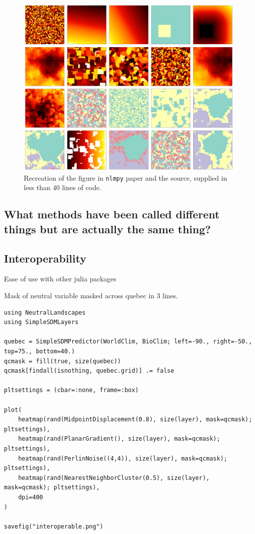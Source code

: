 \documentclass[11pt]{article}
\makeatletter
\def\maxwidth{\ifdim\Gin@nat@width>\linewidth\linewidth
\else\Gin@nat@width\fi}
\let\Oldincludegraphics\includegraphics
\renewcommand{\includegraphics}[1]{\Oldincludegraphics[width=\maxwidth]{#1}}
\makeatother
\begin{document}
\begin{figure}
\hypertarget{fig:allmethods}{%
\centering
\includegraphics{./figures/figure1.png}
\caption{Recreation of the figure in \texttt{nlmpy} paper and the
source, supplied in less than 40 lines of code.}\label{fig:allmethods}
}
\end{figure}

\hypertarget{what-methods-have-been-called-different-things-but-are-actually-the-same-thing}{%
\subsection{What methods have been called different things but are
actually the same
thing?}\label{what-methods-have-been-called-different-things-but-are-actually-the-same-thing}}

\hypertarget{interoperability}{%
\subsection{Interoperability}\label{interoperability}}

Ease of use with other julia packages

Mask of neutral variable masked across quebec in 3 lines.

\begin{verbatim}
using NeutralLandscapes
using SimpleSDMLayers

quebec = SimpleSDMPredictor(WorldClim, BioClim; left=-90., right=-50., top=75., bottom=40.)
qcmask = fill(true, size(quebec)) 
qcmask[findall(isnothing, quebec.grid)] .= false

pltsettings = (cbar=:none, frame=:box)

plot(
    heatmap(rand(MidpointDisplacement(0.8), size(layer), mask=qcmask); pltsettings),
    heatmap(rand(PlanarGradient(), size(layer), mask=qcmask); pltsettings),
    heatmap(rand(PerlinNoise((4,4)), size(layer), mask=qcmask); pltsettings),
    heatmap(rand(NearestNeighborCluster(0.5), size(layer), mask=qcmask); pltsettings),
    dpi=400
)

savefig("interoperable.png")
\end{verbatim}
\end{document}
